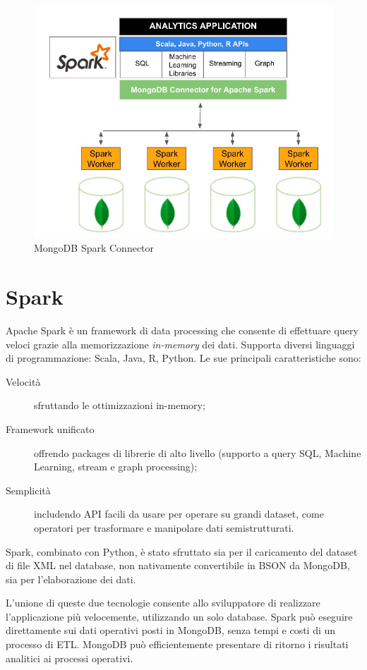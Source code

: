 \begin{figure}[H]
	\centering
	\includegraphics[scale=0.5]{image/mongospark.jpg}
	\caption{MongoDB Spark Connector}
	\label{fig:msc}
\end{figure}

\section{Spark}
Apache Spark è un framework di data processing che consente di effettuare query veloci grazie alla memorizzazione \emph{in-memory} dei dati. Supporta diversi linguaggi di programmazione: Scala, Java, R, Python. Le sue principali caratteristiche sono:
\begin{description}
	\item[Velocità] sfruttando le ottimizzazioni in-memory;
	\item[Framework unificato] offrendo packages di librerie di alto livello (supporto a query SQL, Machine Learning, stream e graph processing);
	\item[Semplicità] includendo API facili da usare per operare su grandi dataset, come operatori per trasformare e manipolare dati semistrutturati.
\end{description}
Spark, combinato con Python, è stato sfruttato sia per il caricamento del dataset di file XML nel database, non nativamente convertibile in BSON da MongoDB, sia per l'elaborazione dei dati.\par 
L'unione di queste due tecnologie consente allo sviluppatore di realizzare l'applicazione più velocemente, utilizzando un solo database. Spark può eseguire direttamente sui dati operativi posti in MongoDB, senza tempi e costi di un processo di ETL. MongoDB può efficientemente presentare di ritorno i risultati analitici ai processi operativi.\par 

